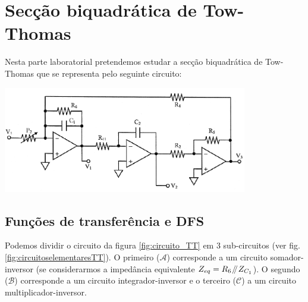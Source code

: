 \documentclass[a4paper,11pt]{report}
\newcommand{\parallelsum}{\mathbin{\!/\mkern-5mu/\!}} %
\begin{document}
\chapter{Secção biquadrática de Tow-Thomas}



Nesta parte laboratorial pretendemos estudar a secção biquadrática de Tow-Thomas  que se representa pelo seguinte circuito:

  \begin{center}
     \includegraphics[angle=0,width=0.8\textwidth]{circuito_TT.png}
     \label{fig:circuito_TT}
     \end{center}


\section{Funções de transferência e DFS}


Podemos dividir o circuito da figura \ref{fig:circuito_TT} em 3 sub-circuitos (ver fig. \ref{fig:circuitoselementaresTT}). O primeiro ($\mathcal{A}$) corresponde a um circuito somador-inversor (se considerarmos a impedância equivalente $Z_{eq}=R_6\parallelsum Z_{C_1}$). O segundo ($\mathcal{B}$) corresponde a um circuito integrador-inversor e o terceiro ($\mathcal{C}$) a um circuito multiplicador-inversor.
\end{document}
